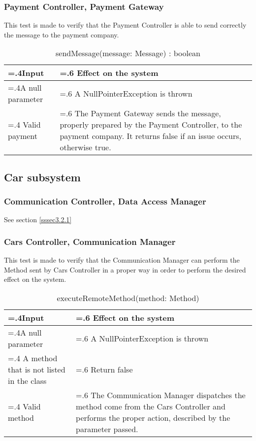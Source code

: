 \documentclass[10pt, a4paper,titlepage]{article}
\begin{document}
\subsubsection{Payment Controller, Payment Gateway}
This test is made to verify that the Payment Controller is able to send correctly the message to the payment company.
\begin{table}[h]
\caption{sendMessage(message: Message) : boolean}
\begin{tabularx}{\textwidth}{|>{\hsize=.4\hsize}X|>{\hsize=.6\hsize}X|}
\hline
Input & Effect on the system\\
\hline
A null parameter & A NullPointerException is thrown\\
\hline
Valid payment & The Payment Gateway sends the message, properly prepared by the Payment Controller, to the payment company. It returns false if an issue occurs, otherwise true.\\
\hline
\end{tabularx}
\end{table}
\linebreak
\subsection{Car subsystem}
\subsubsection{Communication Controller, Data Access Manager}
See section \ref{sssec3.2.1}
\subsubsection{Cars Controller, Communication Manager}
This test is made to verify that the Communication Manager can perform the Method sent by Cars Controller in a proper way in order to perform the desired effect on the system.
\begin{table}[h]
\caption{executeRemoteMethod(method: Method)}
\begin{tabularx}{\textwidth}{|>{\hsize=.4\hsize}X|>{\hsize=.6\hsize}X|}
\hline
Input & Effect on the system\\
\hline
A null parameter & A NullPointerException is thrown\\
\hline
A method that is not listed in the class & Return false\\
\hline
Valid method & The Communication Manager dispatches the method come from the Cars Controller and performs the proper action, described by the parameter passed. \\
\hline
\end{tabularx}
\end{table}
\end{document}
